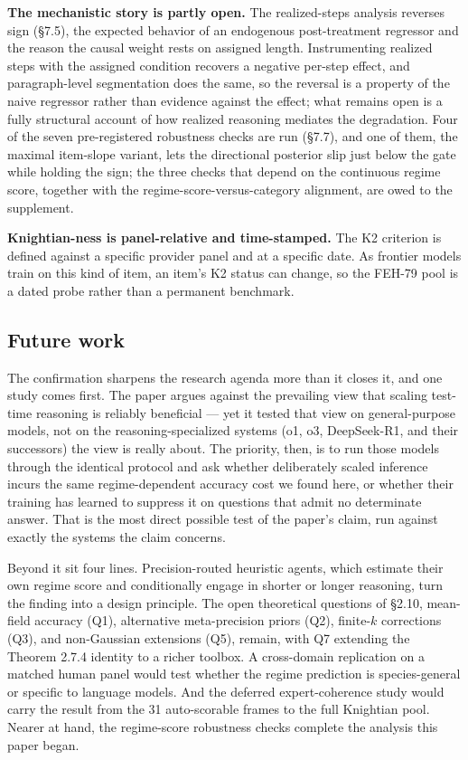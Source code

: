 \documentclass{article}
\begin{document}
\textbf{The mechanistic story is partly open.} The realized-steps
analysis reverses sign (\S{}7.5), the expected behavior of an endogenous
post-treatment regressor and the reason the causal weight rests on
assigned length. Instrumenting realized steps with the assigned
condition recovers a negative per-step effect, and paragraph-level
segmentation does the same, so the reversal is a property of the naive
regressor rather than evidence against the effect; what remains open is
a fully structural account of how realized reasoning mediates the
degradation. Four of the seven pre-registered robustness checks are run
(\S{}7.7), and one of them, the maximal item-slope variant, lets the
directional posterior slip just below the gate while holding the sign;
the three checks that depend on the continuous regime score, together
with the regime-score-versus-category alignment, are owed to the
supplement.

\textbf{Knightian-ness is panel-relative and time-stamped.} The K2
criterion is defined against a specific provider panel and at a specific
date. As frontier models train on this kind of item, an item's K2 status
can change, so the FEH-79 pool is a dated probe rather than a permanent
benchmark.

\subsection{Future work}\label{future-work}

The confirmation sharpens the research agenda more than it closes it,
and one study comes first. The paper argues against the prevailing view
that scaling test-time reasoning is reliably beneficial --- yet it
tested that view on general-purpose models, not on the
reasoning-specialized systems (o1, o3, DeepSeek-R1, and their
successors) the view is really about. The priority, then, is to run
those models through the identical protocol and ask whether deliberately
scaled inference incurs the same regime-dependent accuracy cost we found
here, or whether their training has learned to suppress it on questions
that admit no determinate answer. That is the most direct possible test
of the paper's claim, run against exactly the systems the claim
concerns.

Beyond it sit four lines. Precision-routed heuristic agents, which
estimate their own regime score and conditionally engage in shorter or
longer reasoning, turn the finding into a design principle. The open
theoretical questions of \S{}2.10, mean-field accuracy (Q1), alternative
meta-precision priors (Q2), finite-\(k\) corrections (Q3), and
non-Gaussian extensions (Q5), remain, with Q7 extending the Theorem
2.7.4 identity to a richer toolbox. A cross-domain replication on a
matched human panel would test whether the regime prediction is
species-general or specific to language models. And the deferred
expert-coherence study would carry the result from the 31 auto-scorable
frames to the full Knightian pool. Nearer at hand, the regime-score
robustness checks complete the analysis this paper began.
\end{document}
